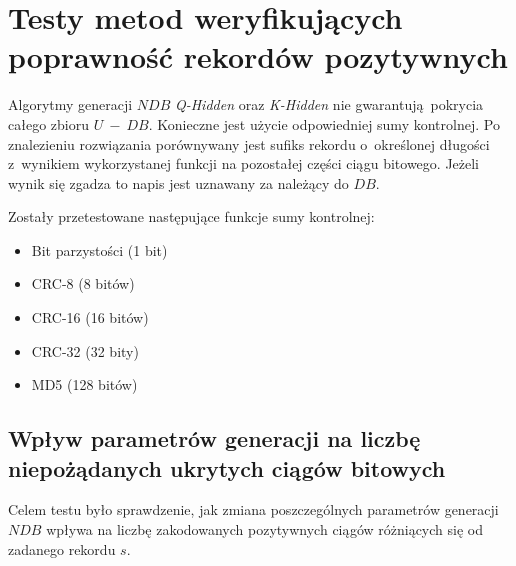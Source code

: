 \section{Testy metod weryfikujących poprawność rekordów pozytywnych}

\label{sec:red-str-test}
Algorytmy generacji $NDB$ \textit{Q-Hidden} oraz \textit{K-Hidden} nie gwarantują pokrycia całego zbioru $U~-~DB$.
Konieczne jest użycie odpowiedniej sumy kontrolnej. Po znalezieniu rozwiązania porównywany jest sufiks rekordu o~określonej
długości z~wynikiem wykorzystanej funkcji na pozostałej części ciągu bitowego. Jeżeli wynik się zgadza to napis jest uznawany za należący
do $DB$.

Zostały przetestowane następujące funkcje sumy kontrolnej:

\begin{itemize}
    \item Bit parzystości (1 bit)
    \item CRC-8 (8 bitów)
    \item CRC-16 (16 bitów)
    \item CRC-32 (32 bity)
    \item MD5 (128 bitów)
\end{itemize}


\subsection{Wpływ parametrów generacji na liczbę niepożądanych ukrytych ciągów bitowych}

Celem testu było sprawdzenie, jak zmiana poszczególnych parametrów generacji $NDB$ wpływa na liczbę zakodowanych pozytywnych ciągów różniących się
od zadanego rekordu $s$. 

